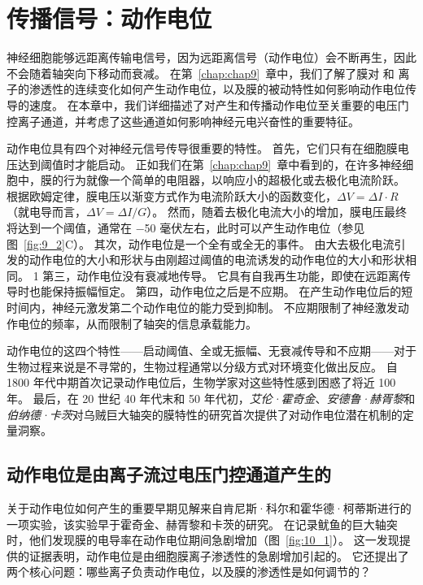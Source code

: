 \chapter{传播信号：动作电位} \label{chap:chap10}

神经细胞能够远距离传输电信号，因为远距离信号（动作电位）会不断再生，因此不会随着轴突向下移动而衰减。
在第~\ref{chap:chap9}~章中，我们了解了膜对  和  离子的渗透性的连续变化如何产生动作电位，以及膜的被动特性如何影响动作电位传导的速度。
在本章中，我们详细描述了对产生和传播动作电位至关重要的电压门控离子通道，并考虑了这些通道如何影响神经元电兴奋性的重要特征。


动作电位具有四个对神经元信号传导很重要的特性。
首先，它们只有在细胞膜电压达到阈值时才能启动。
正如我们在第~\ref{chap:chap9}~章中看到的，在许多神经细胞中，膜的行为就像一个简单的电阻器，以响应小的超极化或去极化电流阶跃。
根据欧姆定律，膜电压以渐变方式作为电流阶跃大小的函数变化，$\Delta V = \Delta I \cdot R$（就电导而言，$\Delta V = \Delta I / G$）。
然而，随着去极化电流大小的增加，膜电压最终将达到一个阈值，通常在 −50 毫伏左右，此时可以产生动作电位（参见图~\ref{fig:9_2}C）。
其次，动作电位是一个全有或全无的事件。
由大去极化电流引发的动作电位的大小和形状与由刚超过阈值的电流诱发的动作电位的大小和形状相同。
1 第三，动作电位没有衰减地传导。
它具有自我再生功能，即使在远距离传导时也能保持振幅恒定。
第四，动作电位之后是不应期。
在产生动作电位后的短时间内，神经元激发第二个动作电位的能力受到抑制。
不应期限制了神经激发动作电位的频率，从而限制了轴突的信息承载能力。


动作电位的这四个特性——启动阈值、全或无振幅、无衰减传导和不应期——对于生物过程来说是不寻常的，生物过程通常以分级方式对环境变化做出反应。
自 1800 年代中期首次记录动作电位后，生物学家对这些特性感到困惑了将近 100 年。
最后，在 20 世纪 40 年代末和 50 年代初，\textit{艾伦·霍奇金}、\textit{安德鲁·赫胥黎}和\textit{伯纳德·卡茨}对乌贼巨大轴突的膜特性的研究首次提供了对动作电位潜在机制的定量洞察。



\section{动作电位是由离子流过电压门控通道产生的}

关于动作电位如何产生的重要早期见解来自肯尼斯·科尔和霍华德·柯蒂斯进行的一项实验，该实验早于霍奇金、赫胥黎和卡茨的研究。
在记录鱿鱼的巨大轴突时，他们发现膜的电导率在动作电位期间急剧增加（图~\ref{fig:10_1}）。
这一发现提供的证据表明，动作电位是由细胞膜离子渗透性的急剧增加引起的。
它还提出了两个核心问题：哪些离子负责动作电位，以及膜的渗透性是如何调节的？



